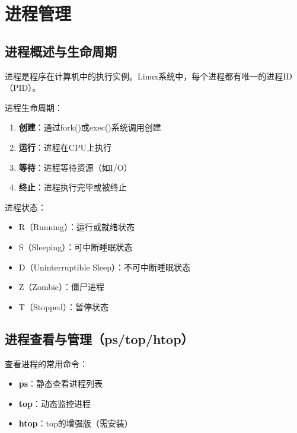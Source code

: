 \documentclass[12pt,UTF8]{ctexbook}
\begin{document}

\makeatletter
\@mainmattertrue
\makeatother

\chapter{进程管理}
\label{chap:process-management}

\section{进程概述与生命周期}
\label{sec:process-overview}

进程是程序在计算机中的执行实例。Linux系统中，每个进程都有唯一的进程ID（PID）。

进程生命周期：
\begin{enumerate}
    \item \textbf{创建}：通过fork()或exec()系统调用创建
    \item \textbf{运行}：进程在CPU上执行
    \item \textbf{等待}：进程等待资源（如I/O）
    \item \textbf{终止}：进程执行完毕或被终止
\end{enumerate}

进程状态：
\begin{itemize}
    \item R（Running）：运行或就绪状态
    \item S（Sleeping）：可中断睡眠状态
    \item D（Uninterruptible Sleep）：不可中断睡眠状态
    \item Z（Zombie）：僵尸进程
    \item T（Stopped）：暂停状态
\end{itemize}

\section{进程查看与管理（ps/top/htop）}
\label{sec:process-tools}

查看进程的常用命令：

\begin{itemize}
    \item \textbf{ps}：静态查看进程列表
    \item \textbf{top}：动态监控进程
    \item \textbf{htop}：top的增强版（需安装）
\end{itemize}
\end{document}
